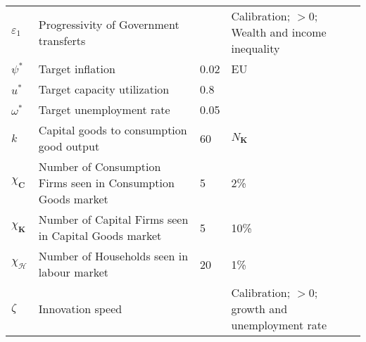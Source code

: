 \documentclass[a4paper, headings=standardclasses]{scrartcl}
\begin{document}
\begin{xltabular}{\linewidth}{lXlX}
    $\varepsilon_1$                   & Progressivity of Government transferts                      &      & Calibration; $>0$; Wealth and income inequality                                                                                                                                                            \\
    $\psi^*$                     & Target inflation                                             & 0.02  & EU                                                                                                                                                            \\
    $u^*$                        & Target capacity utilization                                  & 0.8   &                                                                                                                                                             \\
    $\omega^*$                   & Target unemployment rate                                     & 0.05  &                                                                                                                                                             \\
    $k$                          & Capital goods to consumption good output                     & 60     & $N_\mathbf{K}$                                                                                                                                                            \\
    $\chi_\mathbf{C}$            & Number of Consumption Firms seen in Consumption Goods market & 5      & 2\%                                                                                                                                                            \\
    $\chi_\mathbf{K}$            & Number of Capital Firms seen in Capital Goods market         & 5      & 10\%                                                                                                                                                            \\
    $\chi_\mathcal{H}$           & Number of Households seen in labour market                   & 20      & 1\%                                                                                                                                                            \\
    $\zeta$                      & Innovation speed                                             &       & Calibration; $>0$; growth and unemployment rate                                                                                                                                                            \\

\end{xltabular}
\end{document}
